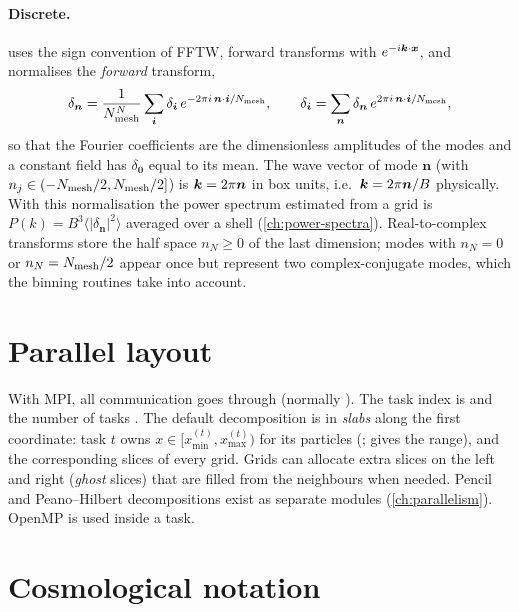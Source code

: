 \paragraph*{Discrete.}  uses the sign convention of FFTW, forward transforms with $e^{-i\bm{k}\cdot\bm{x}}$,
and normalises the \emph{forward} transform,
\begin{equation}
\delta_{\bm n}=\frac{1}{N_{\rm mesh}^N}\sum_{\bm i}\delta_{\bm i}\,e^{-2\pi i\,\bm n\cdot\bm i/N_{\rm mesh}},\qquad
\delta_{\bm i}=\sum_{\bm n}\delta_{\bm n}\,e^{2\pi i\,\bm n\cdot\bm i/N_{\rm mesh}},
\end{equation}
so that the Fourier coefficients are the dimensionless amplitudes of the modes and a constant field has
$\delta_{\bm 0}$ equal to its mean. The wave vector of mode $\bm n$ (with $n_j\in(-N_{\rm mesh}/2,N_{\rm mesh}/2]$) is
$\bm{k}=2\pi\bm n$ in box units, i.e.\ $\bm{k}=2\pi\bm n/B$ physically. With this normalisation the power spectrum
estimated from a grid is $P(k)=B^3\langle|\delta_{\bm n}|^2\rangle$ averaged over a shell
(\cref{ch:power-spectra}). Real-to-complex transforms store the half space $n_N\ge0$ of the last dimension; modes with
$n_N=0$ or $n_N=N_{\rm mesh}/2$ appear once but represent two complex-conjugate modes, which the binning routines take
into account.

\section{Parallel layout}

With MPI, all communication goes through  (normally ). The task index is
 and the number of tasks . The default decomposition is in \emph{slabs} along the
first coordinate: task $t$ owns $x\in[x_{\min}^{(t)},x_{\max}^{(t)})$ for its particles
(;  gives the range), and the corresponding slices of every grid. Grids can allocate extra
slices on the left and right (\emph{ghost} slices) that are filled from the neighbours when needed. Pencil and
Peano--Hilbert decompositions exist as separate modules (\cref{ch:parallelism}). OpenMP is used inside a task.

\section{Cosmological notation}

